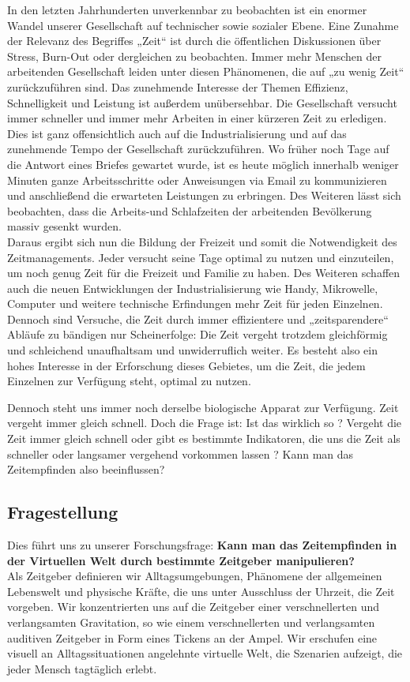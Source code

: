 \documentclass{Paper}
\begin{document}
In den letzten Jahrhunderten unverkennbar zu beobachten ist ein enormer Wandel unserer Gesellschaft auf technischer sowie sozialer Ebene.
Eine Zunahme der Relevanz des Begriffes „Zeit“ ist durch die öffentlichen Diskussionen über Stress, Burn-Out oder dergleichen zu beobachten.
Immer mehr Menschen der arbeitenden Gesellschaft leiden unter diesen Phänomenen, die auf „zu wenig Zeit“ zurückzuführen sind. Das zunehmende Interesse der Themen Effizienz, Schnelligkeit und Leistung ist außerdem unübersehbar. Die Gesellschaft versucht immer schneller und immer mehr Arbeiten in einer kürzeren Zeit zu erledigen. Dies ist ganz offensichtlich auch auf die Industrialisierung und auf das zunehmende Tempo der Gesellschaft zurückzuführen. Wo früher noch Tage auf die Antwort eines Briefes gewartet wurde, ist es heute möglich innerhalb weniger Minuten ganze Arbeitsschritte oder Anweisungen via Email zu kommunizieren und anschließend die erwarteten Leistungen zu erbringen.
Des Weiteren lässt sich beobachten, dass die Arbeits-und Schlafzeiten der arbeitenden Bevölkerung massiv gesenkt wurden.
\\
Daraus ergibt sich nun die Bildung der Freizeit und somit die Notwendigkeit des Zeitmanagements. Jeder versucht seine Tage optimal zu nutzen und einzuteilen, um noch genug Zeit für die Freizeit und Familie zu haben. Des Weiteren schaffen auch die neuen Entwicklungen der Industrialisierung wie Handy, Mikrowelle, Computer und weitere technische Erfindungen mehr Zeit für jeden Einzelnen. Dennoch sind Versuche, die Zeit durch immer effizientere und „zeitsparendere“ Abläufe zu bändigen nur Scheinerfolge: Die Zeit vergeht trotzdem gleichförmig und schleichend unaufhaltsam und unwiderruflich weiter. Es besteht also ein hohes Interesse in der Erforschung dieses Gebietes, um die Zeit, die jedem Einzelnen zur Verfügung steht, optimal zu nutzen.

Dennoch steht uns immer noch derselbe biologische Apparat zur Verfügung. Zeit vergeht immer gleich schnell. Doch die Frage ist: Ist das wirklich so ? Vergeht die Zeit immer gleich schnell oder gibt es bestimmte Indikatoren, die uns die Zeit als schneller oder langsamer vergehend vorkommen lassen ? Kann man das Zeitempfinden also beeinflussen?

\subsection{Fragestellung }
Dies führt uns zu unserer Forschungsfrage: \textbf{Kann man das Zeitempfinden in der Virtuellen Welt durch bestimmte Zeitgeber manipulieren?}\\
Als Zeitgeber definieren wir Alltagsumgebungen, Phänomene der allgemeinen Lebenswelt und physische Kräfte, die uns unter Ausschluss der Uhrzeit, die Zeit vorgeben.
Wir konzentrierten uns auf die Zeitgeber einer verschnellerten und verlangsamten Gravitation, so wie einem verschnellerten und verlangsamten auditiven Zeitgeber in Form eines Tickens an der Ampel. Wir erschufen eine visuell an Alltagssituationen angelehnte virtuelle Welt, die Szenarien aufzeigt, die jeder Mensch tagtäglich erlebt.
\end{document}

